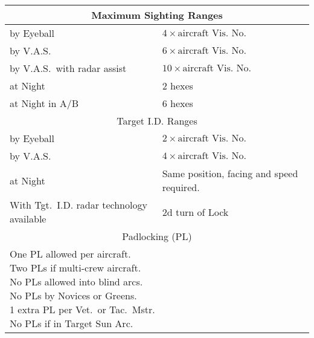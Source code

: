 \begin{onecolumntablefloat}
\begin{onecolumntable}
\begin{tabularx}{\linewidth}{p{12em}X}
\toprule
\multicolumn{2}{c}{Maximum Sighting Ranges}\\
\midrule
by Eyeball&$4 \times \mbox{aircraft Vis.\ No.}$\\
by V.A.S. &$6 \times \mbox{aircraft Vis.\ No.}$\\
by V.A.S.\ with radar assist&$10 \times \mbox{aircraft Vis.\ No.}$\\
at Night&2 hexes\\
at Night in A/B&6 hexes\\
\midrule
\multicolumn{2}{c}{Target I.D. Ranges}\\
\midrule
by Eyeball&$2 \times \mbox{aircraft Vis.\ No.}$\\
by V.A.S. &$4 \times \mbox{aircraft Vis.\ No.}$\\
at Night&Same position, facing and speed required.\\
With Tgt.\ I.D. radar technology available&2d turn of Lock\\
\midrule
\multicolumn{2}{c}{Padlocking (PL)}\\
\midrule
\multicolumn{2}{p{24em}}{
One PL allowed per aircraft.\newline
Two PLs if multi-crew aircraft.\newline
No PLs allowed into blind arcs.\newline
No PLs by Novices or Greens.\newline
1 extra PL per Vet.\ or Tac.\ Mstr.\newline
No PLs if in Target Sun Arc.
}\\
\bottomrule
\end{tabularx}
\end{onecolumntable}
\end{onecolumntablefloat}
